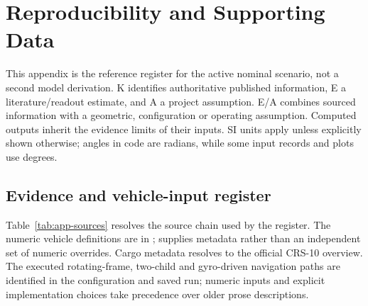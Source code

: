 \appendix
\section{Reproducibility and Supporting Data}
\label{sec:appendix}
This appendix is the reference register for the active nominal scenario, not a second model derivation. K identifies authoritative published information, E a literature/readout estimate, and A a project assumption. E/A combines sourced information with a geometric, configuration or operating assumption. Computed outputs inherit the evidence limits of their inputs. SI units apply unless explicitly shown otherwise; angles in code are radians, while some input records and plots use degrees.

\subsection{Evidence and vehicle-input register}
\label{sec:appendix-evidence}
Table~\ref{tab:app-sources} resolves the source chain used by the register. The numeric vehicle definitions are in ;  supplies metadata rather than an independent set of numeric overrides. Cargo metadata resolves to the official CRS-10 overview. The executed rotating-frame, two-child and gyro-driven navigation paths are identified in the configuration and saved run; numeric inputs and explicit implementation choices take precedence over older prose descriptions.

